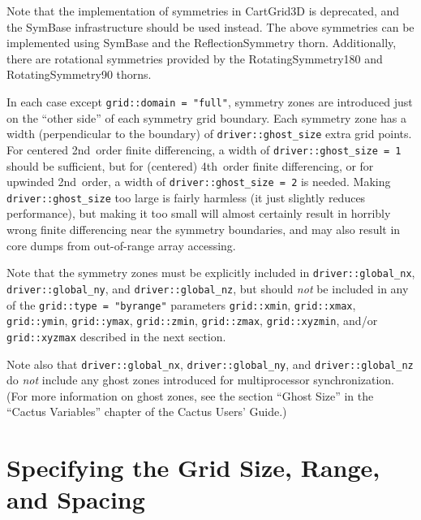 \documentclass{article}
\begin{document}
Note that the implementation of symmetries in CartGrid3D is
deprecated, and the SymBase infrastructure should be used instead.
The above symmetries can be implemented using SymBase and the
ReflectionSymmetry thorn.  Additionally, there are rotational
symmetries provided by the RotatingSymmetry180 and RotatingSymmetry90
thorns.

In each case except \verb|grid::domain = "full"|, symmetry zones are
introduced just on the ``other side'' of each symmetry grid boundary.
Each symmetry zone has a width (perpendicular to the boundary) of
\verb|driver::ghost_size| extra grid points.  For centered 2nd~order
finite differencing, a width of \verb|driver::ghost_size = 1| should be
sufficient, but for (centered) 4th~order finite differencing, or for
upwinded 2nd~order, a width of \verb|driver::ghost_size = 2| is needed.
Making \verb|driver::ghost_size|
too large is fairly harmless (it just slightly reduces performance),
but making it too small will almost certainly result in horribly wrong
finite differencing near the symmetry boundaries, and may also result
in core dumps from out-of-range array accessing.

Note that the symmetry zones must be explicitly included in
\verb|driver::global_nx|, \verb|driver::global_ny|, and
\verb|driver::global_nz|, but should {\em not\/} be included in any
of the \verb|grid::type = "byrange"| parameters \verb|grid::xmin|,
\verb|grid::xmax|, \verb|grid::ymin|, \verb|grid::ymax|, \verb|grid::zmin|,
\verb|grid::zmax|, \verb|grid::xyzmin|, and/or \verb|grid::xyzmax|
described in the next section.

Note also that \verb|driver::global_nx|, \verb|driver::global_ny|,
and \verb|driver::global_nz| do {\em not\/} include any ghost zones
introduced for multiprocessor synchronization.  (For more information
on ghost zones, see the section ``Ghost Size'' in the ``Cactus Variables''
chapter of the Cactus Users' Guide.)


\section{Specifying the Grid Size, Range, and Spacing}
\end{document}
